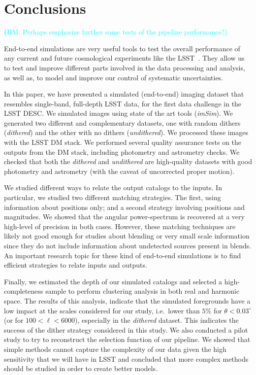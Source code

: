 \documentclass[twocolumn]{aastex62}
\newcommand{\rachel}[1]{{\textcolor{cyan}{{\textbf (RM: #1)}}}}
\begin{document}
\section{Conclusions}
\label{sec:conclusions}

\rachel{Perhaps emphasize further some tests of the pipeline performance?}

End-to-end simulations are very useful tools to test the overall performance of any current and future cosmological experiments like the LSST~\citep{Overview}. They allow us to test and improve different parts involved in the data processing and analysis, as well as, to model and improve our control of systematic uncertainties.

In this paper, we have presented a simulated (end-to-end) imaging dataset that resembles single-band, full-depth LSST data, for the first data challenge in the LSST DESC. We simulated images using state of the art tools (\textit{imSim}). We generated two different and complementary datasets, one with random dithers (\textit{dithered}) and the other with no dithers (\textit{undithered}). We processed these images with the LSST DM stack. We performed several quality assurance tests on the outputs from the DM stack, including photometry and astrometry checks. We checked that both the \textit{dithered} and \textit{undithered} are high-quality datasets with good photometry and astrometry (with the caveat of uncorrected proper motion).

We studied different ways to relate the output catalogs to the inputs. In particular, we studied two different matching strategies. The first, using information about positions only; and a second strategy involving positions and magnitudes. We showed that the angular power-spectrum is recovered at a very high-level of precision in both cases. However, these matching techniques are likely not good enough for studies about blending or very small scale information since they do not include information about undetected sources present in blends. An important research topic for these kind of end-to-end simulations is to find efficient strategies to relate inputs and outputs.

Finally, we estimated the depth of our simulated catalogs and selected a high-completeness sample to perform clustering analysis in both real and harmonic space. The results of this analysis, indicate that the simulated foregrounds have a low impact at the scales considered for our study, i.e.\ lower than $5\%$ for $\theta < 0.03^{\circ}$ (or for $100 < \ell < 6000$), especially in the \textit{dithered} dataset. This indicates the success of the dither strategy considered in this study. We also conducted a pilot study to try to reconstruct the selection function of our pipeline. We showed that simple methods cannot capture the complexity of our data given the high sensitivity that we will have in LSST and concluded that more complex methods should be studied in order to create better models.
\end{document}
